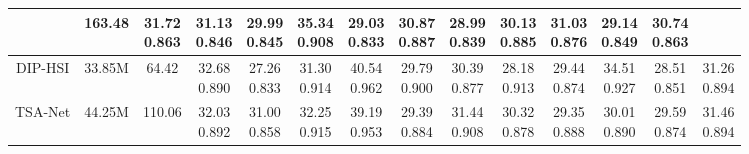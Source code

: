 \documentclass{article}
\begin{document}
\begin{table*}[t]
{\begin{tabular}{cccccccccccccc}
			& 163.48
			&\tabincell{c}{31.72\\0.863}
			&\tabincell{c}{31.13\\0.846}
			&\tabincell{c}{29.99\\0.845}
			&\tabincell{c}{35.34\\0.908}
			&\tabincell{c}{29.03\\0.833}
			&\tabincell{c}{30.87\\0.887}
			&\tabincell{c}{28.99\\0.839}
			&\tabincell{c}{30.13\\0.885}
			&\tabincell{c}{31.03\\0.876}
			&\tabincell{c}{29.14\\0.849}
			&\tabincell{c}{30.74\\0.863}
			\\
			\midrule
			DIP-HSI \cite{self}
			& 33.85M
			& 64.42
			&\tabincell{c}{32.68\\0.890}
			&\tabincell{c}{27.26\\0.833}
			&\tabincell{c}{31.30\\0.914}
			&\tabincell{c}{40.54\\0.962}
			&\tabincell{c}{29.79\\0.900}
			&\tabincell{c}{30.39\\0.877}
			&\tabincell{c}{28.18\\0.913}
			&\tabincell{c}{29.44\\0.874}
			&\tabincell{c}{34.51\\0.927}
			&\tabincell{c}{28.51\\0.851}
			&\tabincell{c}{31.26\\0.894}
			\\
			\midrule
			TSA-Net \cite{tsa_net}
			& 44.25M
			& 110.06
			&\tabincell{c}{32.03\\0.892}
			&\tabincell{c}{31.00\\0.858}
			&\tabincell{c}{32.25\\0.915}
			&\tabincell{c}{39.19\\0.953}
			&\tabincell{c}{29.39\\0.884}
			&\tabincell{c}{31.44\\0.908}
			&\tabincell{c}{30.32\\0.878}
			&\tabincell{c}{29.35\\0.888}
			&\tabincell{c}{30.01\\0.890}
			&\tabincell{c}{29.59\\0.874}
			&\tabincell{c}{31.46\\0.894}

\end{tabular}}
\end{table*}
\end{document}
